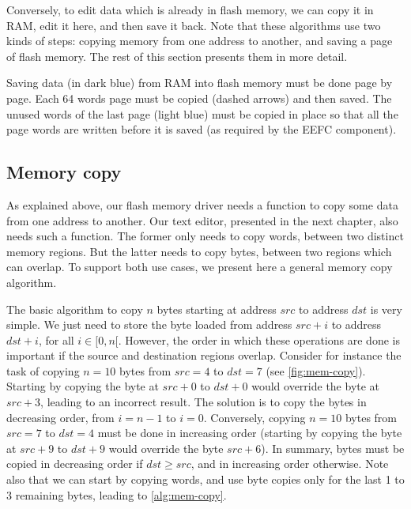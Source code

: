 Conversely, to edit data which is already in flash memory, we can copy it in
RAM, edit it here, and then save it back. Note that these algorithms use two
kinds of steps: copying memory from one address to another, and saving a page
of flash memory. The rest of this section presents them in more detail.

\begin{Figure}
  

  \caption{Saving data (in dark blue) from RAM into flash memory must be done
  page by page. Each 64 words page must be copied (dashed arrows) and then
  saved. The unused words of the last page (light blue) must be copied in place
  so that all the page words are written before it is saved (as required by the
  EEFC component).}\label{fig:flash-driver-overview}
\end{Figure}

\subsection{Memory copy}

As explained above, our flash memory driver needs a function to copy some data
from one address to another. Our text editor, presented in the next chapter,
also needs such a function. The former only needs to copy words, between two
distinct memory regions. But the latter needs to copy bytes, between two
regions which can overlap. To support both use cases, we present here a general
memory copy algorithm.

The basic algorithm to copy $n$ bytes starting at address $src$ to address
$dst$ is very simple. We just need to store the byte loaded from address $src +
i$ to address $dst + i$, for all $i \in [0,n[$. However, the order in which
these operations are done is important if the source and destination regions
overlap. Consider for instance the task of copying $n=10$ bytes from $src=4$ to
$dst=7$ (see \cref{fig:mem-copy}). Starting by copying the byte at $src+0$ to
$dst+0$ would override the byte at $src+3$, leading to an incorrect result. The
solution is to copy the bytes in decreasing order, from $i=n-1$ to $i=0$.
Conversely, copying $n=10$ bytes from $src=7$ to $dst=4$ must be done in
increasing order (starting by copying the byte at $src+9$ to $dst+9$ would
override the byte $src+6$). In summary, bytes must be copied in decreasing
order if $dst \ge src$, and in increasing order otherwise. Note also that we
can start by copying words, and use byte copies only for the last 1 to 3
remaining bytes, leading to \cref{alg:mem-copy}.

